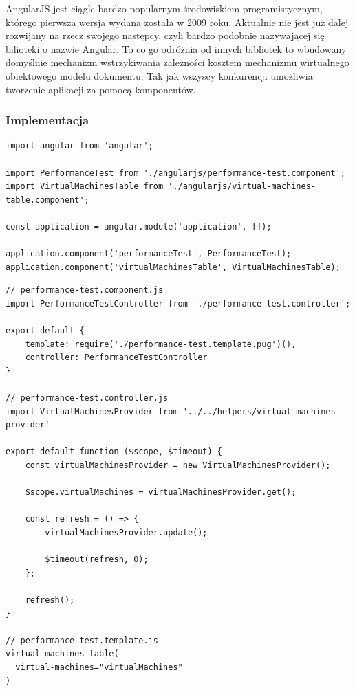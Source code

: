 \documentclass[polish, twoside, 12pt]{mwart}
\begin{document}
AngularJS jest ciągle bardzo popularnym środowiskiem programistycznym, którego pierwsza wersja wydana została w 2009 roku. Aktualnie nie jest już dalej rozwijany na rzecz swojego następcy, czyli bardzo podobnie nazywającej się bilioteki o nazwie Angular. To co go odróżnia od innych bibliotek to wbudowany domyślnie mechanizm wstrzykiwania zależności kosztem mechanizmu wirtualnego obiektowego modelu dokumentu. Tak jak wszyscy konkurencji umożliwia tworzenie aplikacji za pomocą komponentów.

\subsubsection{Implementacja}

\begin{lstlisting}[caption=Inicjalizacja aplikacji oraz rejestracja komponentów]
import angular from 'angular';

import PerformanceTest from './angularjs/performance-test.component';
import VirtualMachinesTable from './angularjs/virtual-machines-table.component';

const application = angular.module('application', []);

application.component('performanceTest', PerformanceTest);
application.component('virtualMachinesTable', VirtualMachinesTable);
\end{lstlisting}

\begin{lstlisting}[caption=Główny komponent]
// performance-test.component.js
import PerformanceTestController from './performance-test.controller';

export default {
    template: require('./performance-test.template.pug')(),
    controller: PerformanceTestController
}

// performance-test.controller.js
import VirtualMachinesProvider from '../../helpers/virtual-machines-provider'

export default function ($scope, $timeout) {
    const virtualMachinesProvider = new VirtualMachinesProvider();
    
    $scope.virtualMachines = virtualMachinesProvider.get();
    
    const refresh = () => {
        virtualMachinesProvider.update();

        $timeout(refresh, 0);
    };

    refresh();
}

// performance-test.template.js
virtual-machines-table(
  virtual-machines="virtualMachines"
)
\end{lstlisting}
\end{document}
